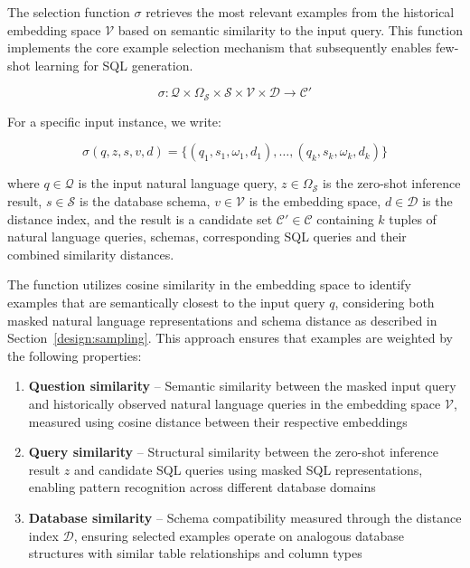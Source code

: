 The selection function $\sigma$ retrieves the most relevant examples from the
historical embedding space $\mathcal{V}$ based on semantic similarity to the
input query. This function implements the core example selection mechanism 
that subsequently enables few-shot learning for SQL generation.

$$
\sigma: \mathcal{Q} \times \Omega_{\mathcal{S}} \times \mathcal{S} \times \mathcal{V} \times \mathcal{D} \rightarrow \mathcal{C}'
$$

\vspace{0.5em}

For a specific input instance, we write:

$$
\sigma(q, z, s, v, d) = \{(q_1, s_1, \omega_1, d_1), \ldots, (q_k, s_k, \omega_k, d_k)\}
$$

\vspace{0.5em}

where $q \in \mathcal{Q}$ is the input natural language query, $z \in \Omega_{\mathcal{S}}$ is the zero-shot inference result, $s \in \mathcal{S}$ is the database schema, $v \in \mathcal{V}$ is the embedding space, $d \in \mathcal{D}$ is the distance index, and the result is a candidate set $\mathcal{C}' \in \mathcal{C}$ containing $k$ tuples of natural language queries, schemas, corresponding SQL queries and their combined similarity distances.

The function utilizes cosine similarity in the embedding space to identify examples
that are semantically closest to the input query $q$, considering both masked natural
language representations and schema distance as described in Section~\ref{design:sampling}.
This approach ensures that examples are weighted by the following properties:

\begin{enumerate}
    \item \textbf{Question similarity} – Semantic similarity between the masked input query and historically observed natural language queries in the embedding space $\mathcal{V}$, measured using cosine distance between their respective embeddings
    \item \textbf{Query similarity} – Structural similarity between the zero-shot inference result $z$ and candidate SQL queries using masked SQL representations, enabling pattern recognition across different database domains
    \item \textbf{Database similarity} – Schema compatibility measured through the distance index $\mathcal{D}$, ensuring selected examples operate on analogous database structures with similar table relationships and column types
\end{enumerate}

